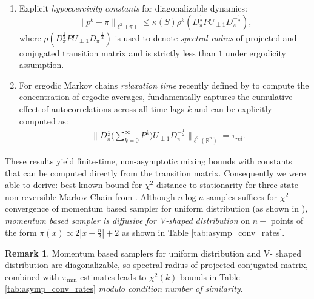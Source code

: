 \documentclass[preprint]{imsart}
\theoremstyle{plain}
\theoremstyle{definition}
\newtheorem{remark}{Remark}
\begin{document}
\begin{enumerate}
  \item Explicit \emph{hypocoercivity constants} for diagonalizable dynamics:
  \[\|p^{k}-\pi\|_{\ell^{2}(\pi)} \leq \kappa(S)\rho^{k}(D_{\pi}^{\frac{1}{2}}PU_{\perp1}D_{\pi}^{-\frac{1}{2}}),\] where $\rho(D_{\pi}^{\frac{1}{2}}PU_{\perp1}D_{\pi}^{-\frac{1}{2}})$ is used to denote \emph{spectral radius} of projected and conjugated transition matrix and is strictly less than $1$ under ergodicity assumption.
  \item For ergodic Markov chains \emph{relaxation time} recently defined by \cite{chatterjee2023spectral} to compute the concentration of ergodic averages, fundamentally captures the cumulative effect of autocorrelations across all time lags $k$ and can be explicitly computed as:
   \begin{align}
       & \nonumber \Bigg\|D_{\pi}^{\frac{1}{2}}\Big(\sum_{k=0}^{\infty}P^{k}\Big)U_{\perp 1}D_{\pi}^{-\frac{1}{2}}\Bigg\|_{\ell^{2}(\mathbb{R}^{n})}=\tau_{rel}.
   \end{align}
\end{enumerate}
These results yield finite-time, non-asymptotic mixing bounds with constants that can be computed directly from the transition matrix. Consequently we were able to derive: best known bound for $\chi^{2}$ distance to stationarity for three-state non-reversible Markov Chain from \cite{choi2017analysis}. Although $n\log{n}$ samples suffices for $\chi^{2}$ convergence of momentum based sampler for uniform distribution (as shown in \cite{diaconis2000analysis}), \emph{momentum based sampler is diffusive for \emph{V-shaped distribution}} on $n-$ points of the form $\pi(x) \propto 2|x-\tfrac{n}{2}|+2$ as shown in Table \ref{tab:asymp_conv_rates}.   \begin{remark}
    Momentum based samplers for uniform distribution and $\mathrm{V}$- shaped distribution are diagonalizable, so spectral radius of projected conjugated matrix, combined with $\pi_{\min}$ estimates leads to $\chi^{2}(k)$ bounds in Table \ref{tab:asymp_conv_rates} \emph{modulo condition number of similarity}.  
\end{remark}   
\end{document}
